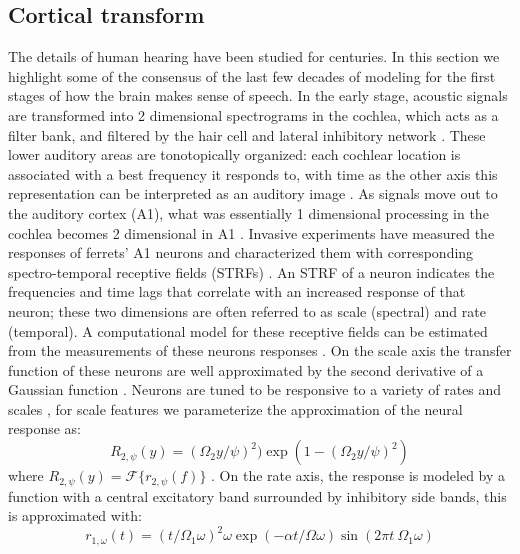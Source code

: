 \documentclass{article}
\begin{document}
\subsection{Cortical transform}
The details of human hearing have been studied for centuries. In this section we highlight some of the consensus of the last few decades of modeling for the first stages of how the brain makes sense of speech. %
In the early stage, acoustic signals are transformed into 2 dimensional spectrograms in the cochlea, which acts as a filter bank, and filtered by the hair cell and lateral inhibitory network \cite{lyon_book,mesgarani_2011}.
These lower auditory areas are tonotopically organized: each cochlear location is associated with a best frequency it responds to, with time as the other axis this representation can be interpreted as an auditory image \cite{lyon_book}.
As signals move out to the auditory cortex (A1), what was essentially 1 dimensional processing in the cochlea becomes 2 dimensional in A1 \cite{nsl_doc}.
Invasive experiments have measured the responses of ferrets' A1 neurons and characterized them with corresponding spectro-temporal receptive fields (STRFs) \cite{mesgarani_2008}.
An STRF of a neuron indicates the frequencies and time lags that correlate with an increased response of that neuron; these two dimensions are often referred to as scale (spectral) and rate (temporal).
%
A computational model for these receptive fields can be estimated from the measurements of these neurons responses \cite{shamma_95,nsl_doc}.
On the scale axis the transfer function of these neurons are well approximated by the second derivative of a Gaussian function \cite{nsl_doc}.
Neurons are tuned to be responsive to a variety of rates and scales \cite{mesgarani_2008},
for scale features we parameterize the approximation of the neural response as:
\begin{equation}
R_{2,\psi}(y) = (\Omega_2 y / \psi)^2)\exp{(1-(\Omega_2 y / \psi)^2)} %
\end{equation}
\noindent
where $R_{2,\psi}(y) = \mathcal{F}\{ r_{2,\psi}(f) \}$ \cite{nsl_doc}.
On the rate axis, the response is modeled by a function with a central excitatory band surrounded by inhibitory side bands, this is approximated with:
\begin{equation}
r_{1,\omega}(t) = (t/\Omega_1\omega)^2\omega\exp{(-\alpha t / \Omega\omega)}\sin (2\pi t \ \Omega_1\omega)%
\end{equation}
\end{document}

